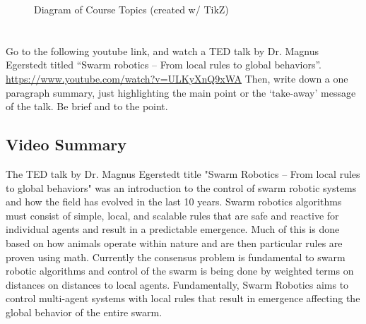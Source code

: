 \documentclass[]{article}
\numberwithin{equation}{section}
\begin{document}
\begin{figure}[h]
	\caption{Diagram of Course Topics (created w/ TikZ)}
	\label{fig:pblm1}
\end{figure}

\newpage
\section{}
Go to the following youtube link, and watch a TED talk by Dr. Magnus Egerstedt titled {``Swarm robotics – From local rules to global behaviors''}.
\href{https://www.youtube.com/watch?v=ULKyXnQ9xWA}{https://www.youtube.com/watch?v=ULKyXnQ9xWA}
Then, write down a one paragraph summary, just highlighting the main point or the ‘take-away’ message of the talk. 
Be brief and to the point.

\subsection{Video Summary}
The TED talk by Dr. Magnus Egerstedt title "Swarm Robotics – From local rules to global behaviors" was an introduction to the control of swarm robotic systems and how the field has evolved in the last 10 years.
Swarm robotics algorithms must consist of simple, local, and scalable rules that are safe and reactive for individual agents and result in a predictable emergence.
Much of this is done based on how animals operate within nature and are then particular rules are proven using math.
Currently the consensus problem is fundamental to swarm robotic algorithms and control of the swarm is being done by weighted terms on distances on distances to local agents.
Fundamentally, Swarm Robotics aims to control multi-agent systems with local rules that result in emergence affecting the global behavior of the entire swarm.
\end{document}
